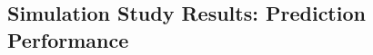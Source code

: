 \documentclass{article}
\begin{document}

\newpage

\subsection{Simulation Study Results: Prediction Performance}\label{app:simResults}
\end{document}
